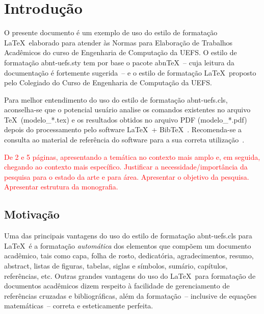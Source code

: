 \chapter{Introdu\c{c}\~ao}
O presente documento \'e um exemplo de uso do estilo de formata\c{c}\~ao \LaTeX\ elaborado para atender \`as Normas para Elabora\c{c}\~ao de Trabalhos Acad\^emicos do curso de Engenharia de Computa\c{c}\~ao da UEFS. O estilo de formata\c{c}\~ao {\ttfamily abnt-uefs.sty} tem por base o pacote abn\TeX~-- cuja leitura da documenta\c{c}\~ao \cite{abnTeX2009} \'e fortemente sugerida~-- e o estilo de formata\c{c}\~ao \LaTeX\ proposto pelo Colegiado do Curso de Engenharia de Computa\c{c}\~ao da UEFS.

Para melhor entendimento do uso do estilo de formata\c{c}\~ao {\ttfamily abnt-uefs.cls}, aconselha-se que o potencial usu\'ario analise os comandos existentes no arquivo \TeX\ ({\ttfamily modelo\_*.tex}) e os resultados obtidos no arquivo PDF ({\ttfamily modelo\_*.pdf}) depois do processamento pelo software \LaTeX\ + Bib\TeX~\cite{LaTeX2009,BibTeX2009}. Recomenda-se a consulta ao material de refer\^encia do software para a sua correta utiliza\c{c}\~ao~\cite{Lamport1986,Buerger1989,Kopka2003,Mittelbach2004}.

\textcolor{red}{De 2 e 5 p\'aginas, apresentando a tem\'atica no contexto mais amplo e, em
seguida, chegando ao contexto mais espec\'ifico. Justificar a necessidade/import\^ancia
da pesquisa para o estado da arte e para \'area. Apresentar o objetivo da pesquisa.
Apresentar estrutura da monografia.
}

\section{Motiva\c{c}\~ao}

Uma das principais vantagens do uso do estilo de formata\c{c}\~ao {\ttfamily abnt-uefs.cls} para \LaTeX\ \'e a formata\c{c}\~ao \textit{autom\'atica} dos elementos que comp\~oem um documento acad\^emico, tais como capa, folha de rosto, dedicat\'oria, agradecimentos, resumo, abstract, listas de figuras, tabelas, siglas e s\'imbolos, sum\'ario, cap\'itulos, refer\^encias, etc. Outras grandes vantagens do uso do \LaTeX\ para formata\c{c}\~ao de documentos acad\^emicos dizem respeito \`a facilidade de gerenciamento de refer\^encias cruzadas e bibliogr\'aficas, al\'em da formata\c{c}\~ao~-- inclusive de equa\c{c}\~oes  matem\'aticas~-- correta e esteticamente perfeita.

